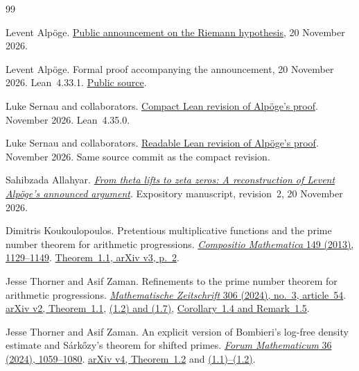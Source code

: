\begingroup\small
\begin{thebibliography}{99}
{}
\setlength{\itemsep}{1pt}

Levent Alp\"oge.
\href{https://alpo.ge/remark.pdf}{Public announcement on the Riemann
hypothesis}, 20 November 2026.

Levent Alp\"oge.
Formal proof accompanying the announcement, 20 November 2026. Lean~4.33.1.
\href{https://github.com/TomasOrtega/RH/tree/a6ac91a412dcbaab31801355ec5707024a71bf65/extracted/lean}{Public source}.

Luke Sernau and collaborators.
\href{https://github.com/lsernau/grh-lean/tree/72fead102f663d5c7a407964a13dc0cf9d977207/grh-compact}{Compact Lean revision of Alp\"oge's proof}.
November 2026. Lean~4.35.0.

Luke Sernau and collaborators.
\href{https://github.com/lsernau/grh-lean/tree/72fead102f663d5c7a407964a13dc0cf9d977207/grh}{Readable Lean revision of Alp\"oge's proof}.
November 2026. Same source commit as the compact revision.

Sahibzada Allahyar.
\href{https://github.com/sahibzada-allahyar/math/blob/rh-exposition-2026-11-20-r2/preprint/alpoge-riemann/reconstruction.pdf}{\emph{From theta lifts to zeta zeros: A reconstruction of Levent Alp\"oge's announced argument}}.
Expository manuscript, revision~2, 20 November 2026.

Dimitris Koukoulopoulos.
Pretentious multiplicative functions and the prime number theorem
for arithmetic progressions.
\href{https://doi.org/10.1112/S0010437X12000802}
{\emph{Compositio Mathematica} 149 (2013), 1129--1149}.
\href{https://arxiv.org/pdf/1203.0596v3\#page=2}
{Theorem~1.1, arXiv v3, p.~2}.

Jesse Thorner and Asif Zaman.
Refinements to the prime number theorem for arithmetic progressions.
\href{https://doi.org/10.1007/s00209-023-03414-3}{\emph{Mathematische
Zeitschrift} 306 (2024), no.~3, article~54}.
\href{https://arxiv.org/pdf/2108.10878v2\#page=1}{arXiv v2, Theorem~1.1},
\href{https://arxiv.org/pdf/2108.10878v2\#page=2}{(1.2) and (1.7)},
\href{https://arxiv.org/pdf/2108.10878v2\#page=3}{Corollary~1.4 and Remark~1.5}.

Jesse Thorner and Asif Zaman.
An explicit version of Bombieri's log-free density estimate and
S\'ark\H{o}zy's theorem for shifted primes.
\href{https://doi.org/10.1515/forum-2023-0091}
{\emph{Forum Mathematicum} 36 (2024), 1059--1080}.
\href{https://arxiv.org/pdf/2208.11123v4\#page=2}
{arXiv v4, Theorem~1.2} and
\href{https://arxiv.org/pdf/2208.11123v4\#page=1}{(1.1)--(1.2)}.


\end{thebibliography}
